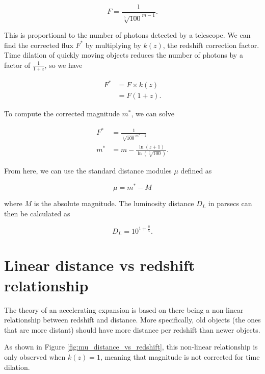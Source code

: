 \documentclass{article}
\begin{document}
\begin{equation}
  F = \frac{1}{\sqrt[5]{100}^{m - 1}}.
\end{equation}

This is proportional to the number of photons detected by a telescope. We can
find the corrected flux $F^*$ by multiplying by $k(z)$, the redshift correction
factor. Time dilation of quickly moving objects reduces the number of photons
by a factor of $\frac{1}{1 + z}$, so we have

\begin{equation}
\begin{aligned}
  F^* &= F \times k(z) \\
      &= F (1 + z).
\end{aligned}
\end{equation}

To compute the corrected magnitude $m^*$, we can solve

\begin{equation}
\begin{aligned}
   F^* &= \frac{1}{\sqrt[5]{100}^{m^* - 1}} \\
   m^* &= m - \frac{\ln{(z + 1)}}{\ln{(\sqrt[5]{100})}}.
\end{aligned}
\end{equation}

From here, we can use the standard distance modules $\mu$ defined as

\begin{equation}
  \mu = m^* - M
\end{equation}

where $M$ is the absolute magnitude. The luminosity distance $D_L$ in parsecs
can then be calculated as

\begin{equation}
  D_L = 10^{1 + \frac{\mu}{5}}.
\end{equation}

\section{Linear distance vs redshift relationship}

The theory of an accelerating expansion is based on there being a non-linear
relationship between redshift and distance. More specifically, old objects (the
ones that are more distant) should have more distance per redshift than newer
objects.

As shown in Figure \ref{fig:mu_distance_vs_redshift}, this non-linear
relationship is only observed when $k(z) = 1$, meaning that magnitude is not
corrected for time dilation.
\end{document}
